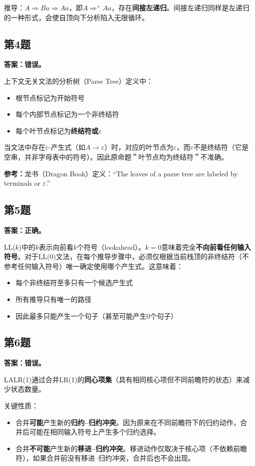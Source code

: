 \documentclass[12pt,a4paper,fontset=fandol]{ctexart}
\begin{document}
推导：$A \Rightarrow Ba \Rightarrow Aa$，即$A \Rightarrow^+ Aa$，存在\textbf{间接左递归}。间接左递归同样是左递归的一种形式，会使自顶向下分析陷入无限循环。

\subsection*{第4题}
\textbf{答案：错误。}

上下文无关文法的分析树（Parse Tree）定义中：
\begin{itemize}
    \item 根节点标记为开始符号
    \item 每个内部节点标记为一个非终结符
    \item 每个叶节点标记为\textbf{终结符或$\varepsilon$}
\end{itemize}

当文法中存在$\varepsilon$-产生式（如$A \to \varepsilon$）时，对应的叶节点为$\varepsilon$，而$\varepsilon$不是终结符（它是空串，并非字母表中的符号）。因此原命题＂叶节点均为终结符＂不准确。

\textbf{参考：}龙书（Dragon Book）定义：``The leaves of a parse tree are labeled by terminals or $\varepsilon$.''

\subsection*{第5题}
\textbf{答案：正确。}

LL($k$)中的$k$表示向前看$k$个符号（lookahead）。$k=0$意味着完全\textbf{不向前看任何输入符号}。对于LL(0)文法，在每个推导步骤中，必须仅根据当前栈顶的非终结符（不参考任何输入符号）唯一确定使用哪个产生式。这意味着：
\begin{itemize}
    \item 每个非终结符至多只有一个候选产生式
    \item 所有推导只有唯一的路径
    \item 因此最多只能产生一个句子（甚至可能产生0个句子）
\end{itemize}

\subsection*{第6题}
\textbf{答案：错误。}

LALR(1)通过合并LR(1)的\textbf{同心项集}（具有相同核心项但不同前瞻符的状态）来减少状态数量。

关键性质：
\begin{itemize}
    \item 合并\textbf{可能}产生新的\textbf{归约--归约冲突}。因为原来在不同前瞻符下的归约动作，合并后可能在相同输入符号上产生多个归约选择。
    \item 合并\textbf{不可能}产生新的\textbf{移进--归约冲突}。移进动作仅取决于核心项（不依赖前瞻符），如果合并前没有移进--归约冲突，合并后也不会出现。
\end{itemize}
\end{document}
